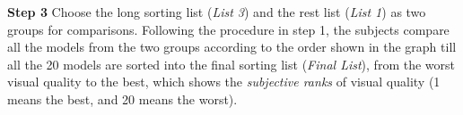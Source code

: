 \textbf{Step 3} Choose the long sorting list (\textit{List 3}) and the rest list (\textit{List 1}) as two groups for comparisons. Following the procedure in step 1, the subjects compare all the models from the two groups according to the order shown in the graph till all the 20 models are sorted into the final sorting list (\textit{Final List}), from the worst visual quality to the best, which shows the \textit{subjective ranks} of visual quality (1 means the best, and 20 means the worst).